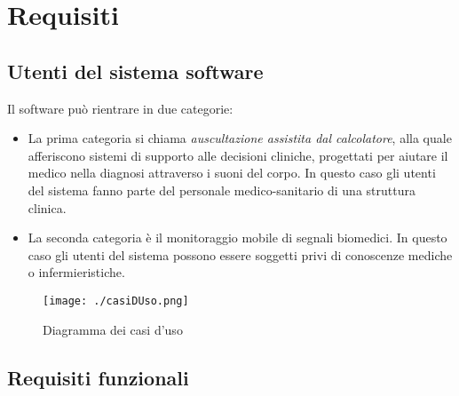 \chapter{Requisiti}



\section{Utenti del sistema software}
Il software pu\`o rientrare in due categorie:
\begin{itemize}
  \item
    La prima categoria si chiama \emph{auscultazione assistita dal calcolatore}, alla quale afferiscono sistemi di supporto alle decisioni cliniche, progettati per aiutare il medico nella diagnosi attraverso i suoni del corpo. 
    In questo caso gli utenti del sistema fanno parte del personale medico-sanitario di una struttura clinica.
  \item
    La seconda categoria \`e il monitoraggio mobile di segnali biomedici. 
    In questo caso gli utenti del sistema possono essere soggetti privi di conoscenze mediche o infermieristiche.
\end{itemize}


\begin{center}
  \begin{figure}
  \texttt{[image: ./casiDUso.png]}
  \caption{Diagramma dei casi d'uso}
  \label{casiDUso}
  \end{figure}
\end{center}



\section{Requisiti funzionali}

